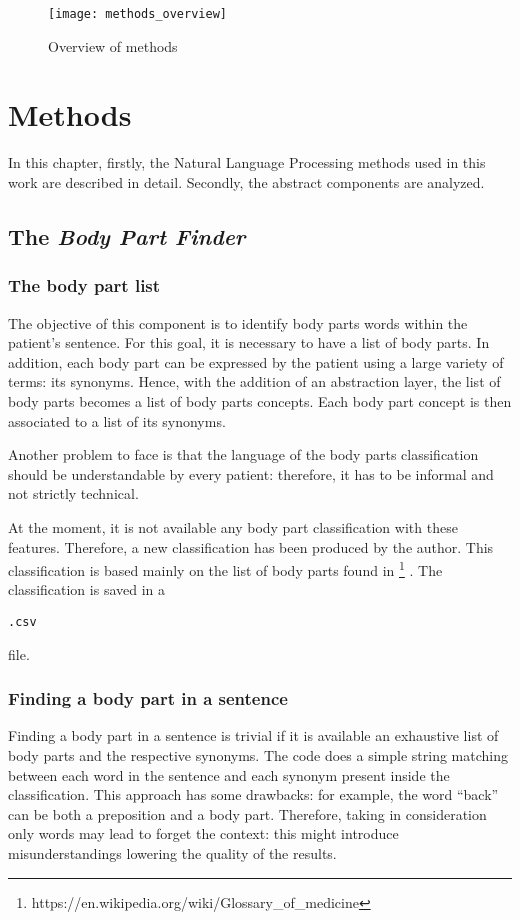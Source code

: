 \begin{figure}[h]
\centering
\texttt{[image: methods\_overview]}
\caption{Overview of methods}
\medskip
\end{figure}

\newpage
\chapter{Methods}
\label{cha:methods}
In this chapter, firstly, the Natural Language Processing methods used in this work are described in detail. Secondly, the abstract components are analyzed.

\section{The \textit{Body Part Finder}}
\label{sec:body_part_finder}
\subsection{The body part list}
The objective of this component is to identify body parts words within the patient's sentence. For this goal, it is necessary to have a list of body parts. In addition, each body part can be expressed by the patient using a large variety of terms: its synonyms. Hence, with the addition of an abstraction layer, the list of body parts becomes a list of body parts concepts. Each body part concept is then associated to a list of its synonyms. 

Another problem to face is that the language of the body parts classification should be understandable by every patient: therefore, it has to be informal and not strictly technical.

At the moment, it is not available any body part classification with these features. Therefore, a new classification has been produced by the author. This classification is based mainly on the list of body parts found in \footnote{https://en.wikipedia.org/wiki/Glossary\_of\_medicine} \cite{bodypartswiki}. The classification is saved in a \begin{verbatim}.csv\end{verbatim} file.

\subsection{Finding a body part in a sentence}
Finding a body part in a sentence is trivial if it is available an exhaustive list of body parts and the respective synonyms. The code does a simple string matching between each word in the sentence and each synonym present inside the classification. This approach has some drawbacks: for example, the word “back” can be both a preposition and a body part. Therefore, taking in consideration only words may lead to forget the context: this might introduce misunderstandings lowering the quality of the results.


